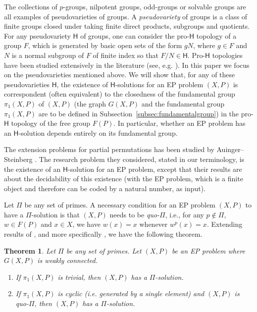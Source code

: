 \documentclass[10pt,a4paper]{amsart}
\newtheorem{theorem}{Theorem}[section]
\theoremstyle{definition}
\theoremstyle{definition}
\numberwithin{equation}{section}
\begin{document}
The collections of $p$-groups, nilpotent groups, odd-groups or solvable groups are all examples of pseudovarieties of groups. A \emph{pseudovariety} of groups is a class of finite groups closed under taking finite direct products, subgroups and quotients.  For any pseudovariety $\mathsf{H}$ of groups, one can consider the pro-$\mathsf{H}$ topology of a group $F$, which is generated by basic open sets of the form $gN$, where $g\in F$ and $N$ is a normal subgroup of $F$ of finite index so that $F/N\in \mathsf{H}$. Pro-$\mathsf{H}$ topologies have been studied extensively in the literature (see, e.g. \cite{RZ94, MSW01, AS04, AS05, AS06, RZBook, MST24a, MST24b, MST25, MST26}). In this paper we focus on the pseudovarieties mentioned above. 
We will show that, for any of these pseudovarieties $\mathsf{H}$, the existence of $\mathsf{H}$-solutions for an EP problem $(X, P)$ is correspondent (often equivalent) to the closedness of the fundamental group $\pi_1(X, P)$ of $(X, P)$ (the graph $G(X, P)$ and the fundamental group $\pi_1(X, P)$ are to be defined in Subsection~\ref{subsec:fundamentalgroup}) in the pro-$\mathsf{H}$ topology of the free group $F(P)$. In particular, whether an EP problem has an $\mathsf{H}$-solution depends entirely on its fundamental group. 

The extension problems for partial permutations has been studied by Auinger--Steinberg \cite{AS03}. The research problem they considered, stated in our terminology, is the existence of an $\mathsf{H}$-solution for an EP problem, except that their results are about the decidability of this existence (with the EP problem, which is a finite object and therefore can be coded by a natural number, as input). 

Let $\Pi$ be any set of primes. A necessary condition for an EP problem $(X, P)$ to have a $\Pi$-solution is that $(X, P)$ needs to be \emph{quo-$\Pi$}, i.e., for any $p\not\in \Pi$, $w\in F(P)$ and $x\in X$, we have $w(x)=x$ whenever $w^p(x)=x$. Extending results of \cite{HPSW19}, and more specifically \cite[Theorem 1.5]{HPSW19}, we have the following theorem.

\begin{theorem}\label{thm:basic} Let $\Pi$ be any set of primes. Let $(X, P)$ be an EP problem where $G(X, P)$ is weakly connected.
\begin{enumerate}
\item[\rm (1)] If $\pi_1(X, P)$ is trivial, then $(X, P)$ has a $\Pi$-solution.
\item[\rm (2)] If $\pi_1(X, P)$ is cyclic (i.e. generated by a single element) and $(X, P)$ is quo-$\Pi$, then $(X, P)$ has a $\Pi$-solution.
\end{enumerate}
\end{theorem}
\end{document}
